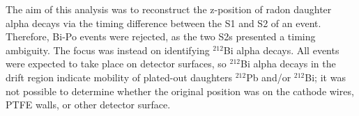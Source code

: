 

The aim of this analysis was to reconstruct the z-position of radon daughter alpha decays via the timing difference between the S1 and S2 of an event. Therefore, Bi-Po events were rejected, as the two S2s presented a timing ambiguity. The focus was instead on identifying $^{212}$Bi alpha decays. All events were expected to take place on detector surfaces, so $^{212}$Bi alpha decays in the drift region indicate mobility of plated-out daughters $^{212}$Pb and/or $^{212}$Bi; it was not possible to determine whether the original position was on the cathode wires, PTFE walls, or other detector surface.

